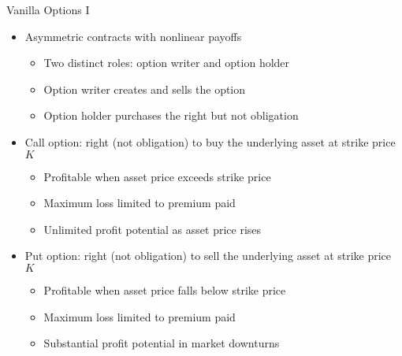 \documentclass[10pt,handout]{beamer}
\begin{document}
\begin{frame}{Vanilla Options I}
  \begin{itemize}[<+->]
    \item Asymmetric contracts with nonlinear payoffs
      \begin{itemize}
        \item Two distinct roles: option writer and option holder
        \item Option writer creates and sells the option
        \item Option holder purchases the right but not obligation
      \end{itemize}
    \item Call option: right (not obligation) to buy the underlying asset at strike price $K$
      \begin{itemize}
        \item Profitable when asset price exceeds strike price
        \item Maximum loss limited to premium paid
        \item Unlimited profit potential as asset price rises
      \end{itemize}
    \item Put option: right (not obligation) to sell the underlying asset at strike price $K$
      \begin{itemize}
        \item Profitable when asset price falls below strike price
        \item Maximum loss limited to premium paid
        \item Substantial profit potential in market downturns
      \end{itemize}
  \end{itemize}
\end{frame}
\end{document}

